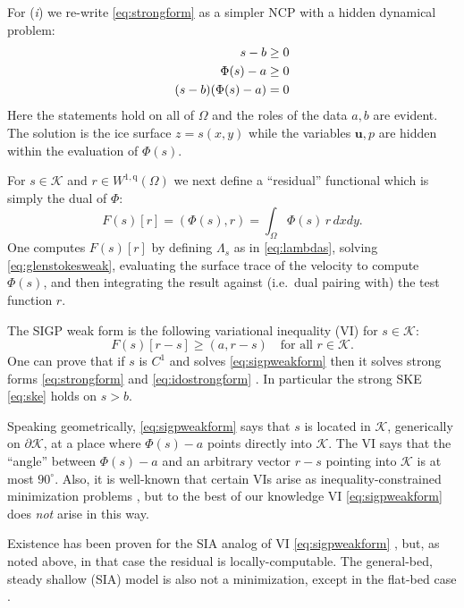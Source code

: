 \documentclass[letterpaper,final,12pt,reqno]{amsart}
\theoremstyle{claim}
\newcommand{\bu}{\mathbf{u}}
\newcommand{\ip}[2]{\left(#1,#2\right)}
\newcommand{\qq}{{\text{q}}}
\numberwithin{equation}{section}
\numberwithin{figure}{section}
\numberwithin{table}{section}
\numberwithin{theorem}{section}
\begin{document}
For (\emph{i}) we re-write \eqref{eq:strongform} as a simpler NCP with a hidden dynamical problem:
\begin{align}
s - b &\ge 0  \label{eq:idostrongform} \\
\Phi(s) - a &\ge 0 \notag \\
(s - b) (\Phi(s) - a) &= 0 \notag
\end{align}
Here the statements hold on all of $\Omega$ and the roles of the data $a,b$ are evident.  The solution is the ice surface $z=s(x,y)$ while the variables $\bu,p$ are hidden within the evaluation of $\Phi(s)$.

For $s \in \mathcal{K}$ and $r \in W^{1,\qq}(\Omega)$ we next define a ``residual'' functional which is simply the dual of $\Phi$:
\begin{equation}
F(s)[r] = \ip{\Phi(s)}{r} = \int_\Omega \Phi(s)\, r \,dx dy. \label{eq:sigpfunctional}
\end{equation}
One computes $F(s)[r]$ by defining $\Lambda_s$ as in \eqref{eq:lambdas}, solving \eqref{eq:glenstokesweak}, evaluating the surface trace of the velocity to compute $\Phi(s)$, and then integrating the result against (i.e.~dual pairing with) the test function $r$.

The SIGP weak form is the following variational inequality (VI) \cite{KinderlehrerStampacchia1980} for $s\in\mathcal{K}$:
\begin{equation}
F(s)[r - s] \ge \ip{a}{r-s} \quad \text{for all $r \in \mathcal{K}$.}  \label{eq:sigpweakform}
\end{equation}
One can prove that if $s$ is $C^1$ and solves \eqref{eq:sigpweakform} then it solves strong forms \eqref{eq:strongform} and \eqref{eq:idostrongform} \cite{Bueler2021conservation}.  In particular the strong SKE \eqref{eq:ske} holds on $s>b$.

Speaking geometrically, \eqref{eq:sigpweakform} says that $s$ is located in $\mathcal{K}$, generically on $\partial\mathcal{K}$, at a place where $\Phi(s)-a$ points directly into $\mathcal{K}$.  The VI says that the ``angle'' between $\Phi(s)-a$ and an arbitrary vector $r-s$ pointing into $\mathcal{K}$ is at most $90^\circ$.  Also, it is well-known that certain VIs arise as inequality-constrained minimization problems \cite{GraeserKornhuber2009,KinderlehrerStampacchia1980}, but to the best of our knowledge VI \eqref{eq:sigpweakform} does \emph{not} arise in this way.

Existence has been proven for the SIA analog of VI \eqref{eq:sigpweakform} \cite{JouvetBueler2012}, but, as noted above, in that case the residual is locally-computable.  The general-bed, steady shallow (SIA) model is also not a minimization, except in the flat-bed case \cite{JouvetBueler2012}.
\end{document}
